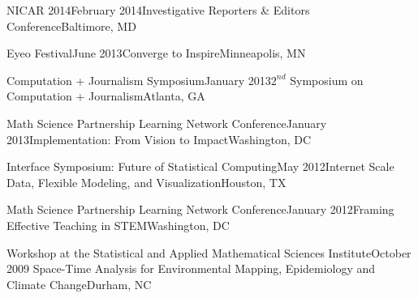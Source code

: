 


\begin{sSubsection}{NICAR 2014}{}{February 2014}{Investigative Reporters \& Editors Conference}{Baltimore, MD}
\end{sSubsection}

\begin{sSubsection}{Eyeo Festival}{}{June 2013}{Converge to Inspire}{Minneapolis, MN}
\end{sSubsection}

\begin{sSubsection}{Computation + Journalism Symposium}{}{January 2013}{$2^{nd}$ Symposium on Computation + Journalism}{Atlanta, GA}
\end{sSubsection}

\begin{sSubsection}{Math Science Partnership Learning Network Conference}{}{January 2013}{Implementation: From Vision to Impact}{Washington, DC}
\end{sSubsection}

\begin{sSubsection}{Interface Symposium: Future of Statistical Computing}{}{May 2012}{Internet Scale Data, Flexible Modeling, and Visualization}{Houston, TX}
\end{sSubsection}

\begin{sSubsection}{Math Science Partnership Learning Network Conference}{}{January 2012}{Framing Effective Teaching in STEM}{Washington, DC}
\end{sSubsection}

\begin{sSubsection}{Workshop at the Statistical and Applied Mathematical Sciences Institute}{}{October 2009}{ Space-Time Analysis for Environmental Mapping, Epidemiology and Climate Change}{Durham, NC}
\end{sSubsection}

